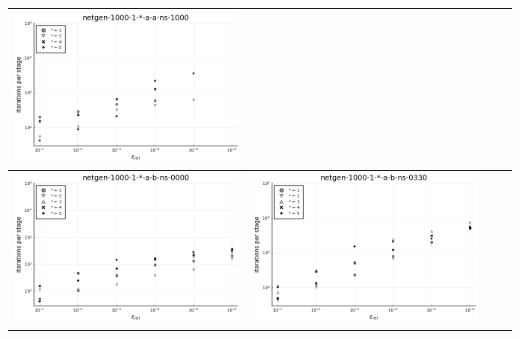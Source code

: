 \documentclass{article}
\begin{document}
\begin{landscape}
\begin{center}
\begin{longtable}{| c | c | c | c |}
\includegraphics[height=0.22\textheight]{itepst_fixlim_netgen-1000-1-_-a-a-ns-1000.png} \\
                \hline
\includegraphics[height=0.22\textheight]{itepst_fixlim_netgen-1000-1-_-a-b-ns-0000.png} &
\includegraphics[height=0.22\textheight]{itepst_fixlim_netgen-1000-1-_-a-b-ns-0330.png} &

\end{longtable}
\end{center}
\end{landscape}
\end{document}
